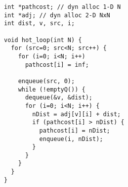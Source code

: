 \begin{lstlisting}[morekeywords={pathcost}, belowskip=0pt, firstnumber=1]
int *pathcost; // dyn alloc 1-D N
int *adj; // dyn alloc 2-D NxN
int dist, v, src, i;

void hot_loop(int N) {
  for (src=0; src<N; src++) {
    for (i=0; i<N; i++)
      pathcost[i] = inf;

    enqueue(src, 0);
    while (!emptyQ()) {
      dequeue(&v, &dist);
      for (i=0; i<N; i++) {
        nDist = adj[v][i] + dist;
        if (pathcost[i] > nDist) {
          pathcost[i] = nDist;
          enqueue(i, nDist);
        }
      }
    }
  }
}
\end{lstlisting}
